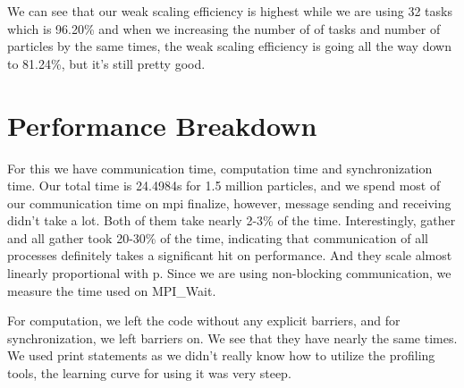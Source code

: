 \documentclass{article}
\begin{document}
We can see that our weak scaling efficiency is highest while we are using 32 tasks which is 96.20\% and when we increasing the number of of tasks and number of particles by the same times, the weak scaling efficiency is going all the way down to 81.24\%, but it's still pretty good.


\section{Performance Breakdown}
For this we have communication time, computation time and synchronization time. Our total time is 24.4984s for 1.5 million particles, and we spend most of our communication time on mpi finalize, however, message sending and receiving didn't take a lot. Both of them take nearly 2-3\% of the time. Interestingly, gather and all gather took 20-30\% of the time, indicating that communication of all processes definitely takes a significant hit on performance. And they scale almost linearly proportional with p. Since we are using non-blocking communication, we measure the time used on MPI\_Wait.

For computation, we left the code without any explicit barriers, and for synchronization, we left barriers on. We see that they have nearly the same times. We used print statements as we didn't really know how to utilize the profiling tools, the learning curve for using it was very steep.
\end{document}
